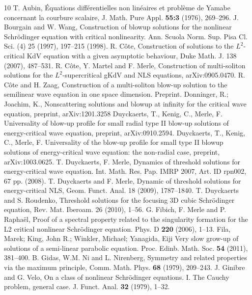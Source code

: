 \documentclass[11pt,a4paper,reqno]{amsart}
\theoremstyle{remark}
\numberwithin{equation}{section}
\begin{document}
\begin{thebibliography}{10}
 T. Aubin, \'Equations diff\'erentielles non lin\'eaires et probl\`eme de Yamabe concernant la courbure scalaire, J. Math. Pure Appl. \textbf{55:3} (1976), 269--296.
 J. Bourgain and  W. Wang,   Construction of blowup solutions for the nonlinear Schr\"odinger equation with critical nonlinearity. Ann. Scuola Norm. Sup. 
Pisa Cl. Sci. (4) 25 (1997),   197--215 (1998). 
 R. C\^ote,  Construction of solutions to the $L^2$-critical KdV equation with a given asymptotic behaviour, Duke Math. J. 138 (2007),   487--531.
 R. C\^ote, Y. Martel and F. Merle,   Construction of multi-soliton solutions for the $L^2$-supercritical gKdV and NLS equations, arXiv:0905.0470.
 R. C\^ote and H. Zaag,
Construction of a multi-soliton blow-up solution to the semilinear wave equation in one space dimension. Preprint.
 Donninger, R.; Joachim, K., Nonscattering solutions and blowup at infinity for the critical wave equation, preprint, arXiv:1201.3258
 Duyckaerts, T., Kenig, C., Merle, F. Universality of blow-up profile for small radial type II
blow-up solutions of energy-critical wave equation, preprint, arXiv:0910.2594.
 Duyckaerts, T., Kenig, C., Merle, F. Universality of the blow-up profile for small type II blowup
solutions of energy-critical wave equation: the non-radial case, preprint, arXiv:1003.0625.
 T. Duyckaerts, F. Merle, Dynamics of threshold solutions for energy-critical wave equation. Int. Math. Res. Pap. IMRP 2007, Art. ID rpn002, 67 pp. (2008).
  T. Duyckaerts and F. Merle,   Dynamic of threshold solutions for energy-critical NLS, Geom. Funct. Anal. 18 (2009),   1787--1840.
 T. Duyckaerts and S. Roudenko,  Threshold solutions for the focusing 3D cubic Schr\"odinger equation, Rev. Mat. Iberoam. 26 (2010),   1--56.
 G. Fibich, F.  Merle and  P. Rapha\"el,
Proof of a spectral property related to the singularity formation for the L2 critical nonlinear Schr\"odinger equation. Phys. D \textbf{220} (2006), 1--13.
 Fila, Marek; King, John R.; Winkler, Michael; Yanagida, Eiji Very slow grow-up of solutions of a semi-linear parabolic equation. Proc. Edinb. Math. Soc. \textbf{54} (2011),  381--400.
 B. Gidas, W.M. Ni and L. Nirenberg, 
Symmetry and related properties via the maximum principle, Comm. Math. Phys. \textbf{68} (1979), 209--243.
 J. Ginibre and  G. Velo, On a class of nonlinear Schr\"odinger equations. I. The Cauchy problem, general case. J. Funct. Anal. \textbf{32} (1979),  1--32.

\end{thebibliography}
\end{document}
